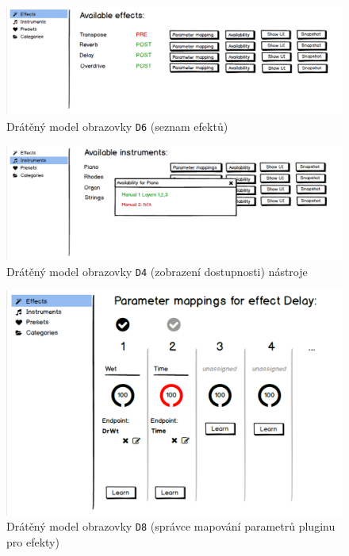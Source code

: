 \documentclass[thesis=M,czech]{FITthesis}[2019/03/06]
\begin{document}
		\begin{figure}
			\centering
			\includegraphics[width=1\textwidth]{DesktopUI-EffectList}
			\caption{Drátěný model obrazovky \texttt{D6} (seznam efektů)}\label{fig:DesktopUI-EffectList}
		\end{figure}
		\begin{figure}
			\centering
			\includegraphics[width=1\textwidth]{DesktopUI-InstrumentAvailability}
			\caption{Drátěný model obrazovky \texttt{D4} (zobrazení dostupnosti) nástroje}\label{fig:DesktopUI-InstrumentAvailability}
		\end{figure}
		\begin{figure}
			\centering
			\includegraphics[width=1\textwidth]{DesktopUI-EffectParamMapping}
			\caption{Drátěný model obrazovky \texttt{D8} (správce mapování parametrů pluginu pro efekty)}\label{fig:DesktopUI-EffectParamMapping}
		\end{figure}
\end{document}
